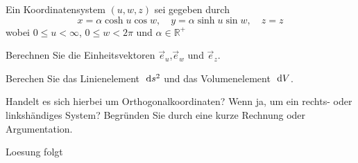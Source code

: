 \documentclass{atistandalonetask}
\begin{document}
  \begin{atiTask}[
    title = Koordinatentransformation
  ]
  Ein Koordinatensystem $(u,w,z)$ sei gegeben durch
  \[
  x=\alpha\cosh u\cos w,\quad y=\alpha \sinh u \sin w,\quad z=z
  \]
  wobei $0\leq u< \infty$, $0\leq w<2\pi$ und $\alpha \in \mathbb{R^+}$
  
 \begin{atiSubtasks}
 \item Berechnen Sie die Einheitsvektoren $\vec{e}_u$,$\vec{e}_w$ und $\vec{e}_z$. 
 \item Berechen Sie das Linienelement $\;\mathrm{d} s^2$ und das Volumenelement $\;\mathrm{d} V$.
 \item Handelt es sich hierbei um Orthogonalkoordinaten? Wenn ja, um ein rechts- oder linkshändiges System? Begründen Sie durch eine kurze Rechnung oder Argumentation.
 \end{atiSubtasks}	
  \end{atiTask}
  \begin{atiSolution}
Loesung folgt
  \end{atiSolution}
\end{document}

